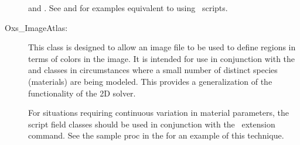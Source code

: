 \begin{description}
\begin{ExampleMifs}
   and .  See
   and  for
  examples equivalent to  using \Tcl\ scripts.
\end{ExampleMifs}

%
\item[Oxs\_ImageAtlas:\label{html:oxsImageAtlas}]%
This class is designed to allow an image file
to be used to define regions in terms of colors in the image.  It is
intended for use in conjunction with the  and
 classes in circumstances where a small
number of distinct species (materials) are being modeled.  This provides
a generalization of the 
functionality of the 2D solver.

For situations requiring continuous variation in material parameters,
the script field classes should be used in conjunction with the
 \MIF\ extension command.  See the
 sample proc in the   for an example of this
technique.


\end{description}
